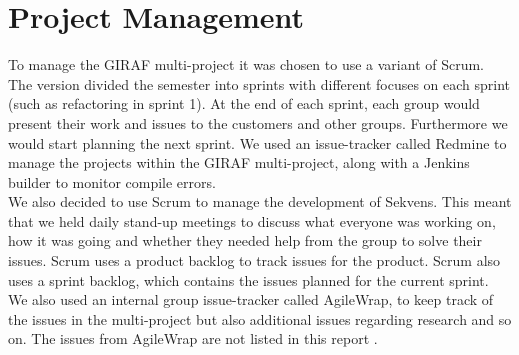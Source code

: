 \section{Project Management}\label{spr1_projmana}
To manage the GIRAF multi-project it was chosen to use a variant of Scrum. The version divided the semester into sprints with different focuses on each sprint (such as refactoring in sprint 1). At the end of each sprint, each group would present their work and issues to the customers and other groups. Furthermore we would start planning the next sprint. We used an issue-tracker called Redmine to manage the projects within the GIRAF multi-project, along with a Jenkins builder to monitor compile errors. \\
We also decided to use Scrum to manage the development of Sekvens. This meant that we held daily stand-up meetings to discuss what everyone was working on, how it was going and whether they needed help from the group to solve their issues. Scrum uses a product backlog to track issues for the product. Scrum also uses a sprint backlog, which contains the issues planned for the current sprint. We also used an internal group issue-tracker called AgileWrap, to keep track of the issues in the multi-project but also additional issues regarding research and so on. The issues from AgileWrap are not listed in this report \cite{agilewrap}.